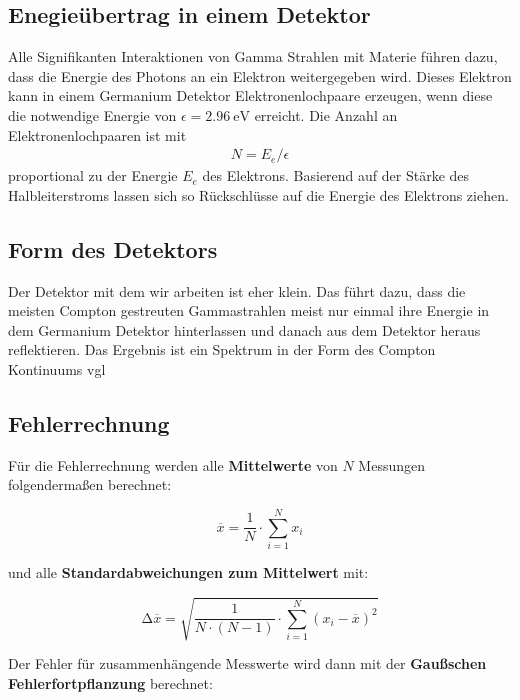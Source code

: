 \subsection{Enegieübertrag in einem Detektor \cite{book:gilmore}}
Alle Signifikanten Interaktionen von Gamma Strahlen mit Materie führen dazu, dass die Energie des Photons 
an ein Elektron weitergegeben wird. 
Dieses Elektron kann in einem Germanium Detektor Elektronenlochpaare erzeugen, wenn diese die notwendige Energie von
$\epsilon = \qty{2.96}{\eV}$ erreicht. 
Die Anzahl an Elektronenlochpaaren ist mit 
\begin{align}
    N = E_e / \epsilon 
\end{align}
proportional zu der Energie $E_e$ des Elektrons.
Basierend auf der Stärke des Halbleiterstroms lassen sich so Rückschlüsse auf die Energie des Elektrons ziehen.

\subsection{Form des Detektors}
Der Detektor mit dem wir arbeiten ist eher klein.
Das führt dazu, dass die meisten Compton gestreuten Gammastrahlen meist nur einmal ihre Energie in dem
Germanium Detektor hinterlassen und danach aus dem Detektor heraus reflektieren.
Das Ergebnis ist ein Spektrum in der Form des Compton Kontinuums vgl

\subsection{Fehlerrechnung}
Für die Fehlerrechnung werden alle \textbf{Mittelwerte} von $N$ Messungen folgendermaßen berechnet:

\begin{equation}
    \overline{x} = \frac{1}{N} \cdot \sum_{i=1}^N x_i
    \label{eqn:Mittelwert}
\end{equation}

und alle \textbf{Standardabweichungen zum Mittelwert} mit:

\begin{equation}
    \increment\overline{x} = \sqrt{\frac{1}{N\cdot(N-1)}\cdot\sum_{i=1}^N (x_i-\overline{x})^2}
    \label{eqn:St_Mittelwert}
\end{equation}

Der Fehler für zusammenhängende Messwerte wird dann mit der \textbf{Gaußschen Fehlerfortpflanzung} berechnet:

